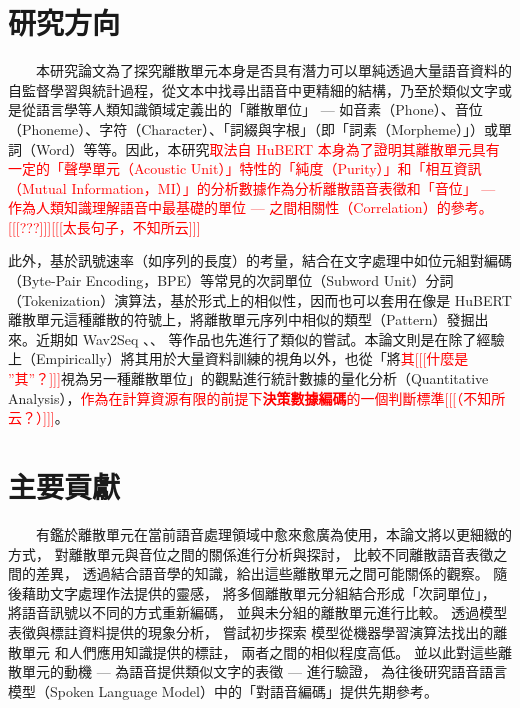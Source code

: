 \section{研究方向}

　　本研究論文為了探究離散單元本身是否具有潛力可以單純透過大量語音資料的自監督學習與統計過程，從文本中找尋出語音中更精細的結構，乃至於類似文字或是從語言學等人類知識領域定義出的「離散單位」 --- 如音素（Phone）、音位（Phoneme）、字符（Character）、「詞綴與字根」（即「詞素（Morpheme）」）或單詞（Word）等等。因此，本研究\textcolor{red}{取法自 HuBERT 本身為了證明其離散單元具有一定的「聲學單元（Acoustic Unit）」特性的「純度（Purity）」和「相互資訊（Mutual Information，MI）」的分析數據作為分析離散語音表徵和「音位」 --- 作為人類知識理解語音中最基礎的單位 --- 之間相關性（Correlation）的參考。[[[???]]][[[太長句子，不知所云]]]}

        此外，基於訊號速率（如序列的長度）的考量，結合在文字處理中如位元組對編碼（Byte-Pair Encoding，BPE）等常見的次詞單位（Subword Unit）分詞（Tokenization）演算法，基於形式上的相似性，因而也可以套用在像是 HuBERT離散單元這種離散的符號上，將離散單元序列中相似的類型（Pattern）發掘出來。近期如 Wav2Seq \cite{wu_wav2seq_2023}、\cite{ren_speech_2022}、\cite{chang_exploring_2024} 等作品也先進行了類似的嘗試。本論文則是在除了經驗上（Empirically）將其用於大量資料訓練的視角以外，也從「將\textcolor{red}{其[[[什麼是 ''其''？]]]}視為另一種離散單位」的觀點進行統計數據的量化分析（Quantitative Analysis），\textcolor{red}{作為在計算資源有限的前提下\textbf{決策數據編碼}的一個判斷標準[[[（不知所云？）]]]}。

\section{主要貢獻}

　　有鑑於離散單元在當前語音處理領域中愈來愈廣為使用，本論文將以更細緻的方式，
對離散單元與音位之間的關係進行分析與探討，
比較不同離散語音表徵之間的差異，
透過結合語音學的知識，給出這些離散單元之間可能關係的觀察。
隨後藉助文字處理作法提供的靈感，
將多個離散單元分組結合形成「次詞單位」，
將語音訊號以不同的方式重新編碼，
並與未分組的離散單元進行比較。
透過模型表徵與標註資料提供的現象分析，
嘗試初步探索
模型從機器學習演算法找出的離散單元
和人們應用知識提供的標註，
兩者之間的相似程度高低。
並以此對這些離散單元的動機 --- 為語音提供類似文字的表徵 --- 進行驗證，
為往後研究語音語言模型（Spoken Language Model）中的「對語音編碼」提供先期參考。

